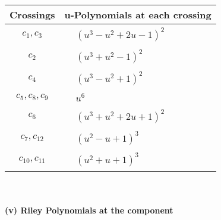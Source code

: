 \documentclass[1p]{elsarticle_modified}
\theoremstyle{definition}
\begin{document}
\begin{tabular}{m{50pt}|m{274pt}}
Crossings & \hspace{64pt}u-Polynomials at each crossing \\
\hline $$\begin{aligned}c_{1},c_{3}\end{aligned}$$&$\begin{aligned}
&(u^3- u^2+2 u-1)^2
\end{aligned}$\\
\hline $$\begin{aligned}c_{2}\end{aligned}$$&$\begin{aligned}
&(u^3+u^2-1)^2
\end{aligned}$\\
\hline $$\begin{aligned}c_{4}\end{aligned}$$&$\begin{aligned}
&(u^3- u^2+1)^2
\end{aligned}$\\
\hline $$\begin{aligned}c_{5},c_{8},c_{9}\end{aligned}$$&$\begin{aligned}
&u^6
\end{aligned}$\\
\hline $$\begin{aligned}c_{6}\end{aligned}$$&$\begin{aligned}
&(u^3+u^2+2 u+1)^2
\end{aligned}$\\
\hline $$\begin{aligned}c_{7},c_{12}\end{aligned}$$&$\begin{aligned}
&(u^2- u+1)^3
\end{aligned}$\\
\hline $$\begin{aligned}c_{10},c_{11}\end{aligned}$$&$\begin{aligned}
&(u^2+u+1)^3
\end{aligned}$\\
\hline
\end{tabular}\\~\\
\newpage\renewcommand{\arraystretch}{1}
\flushleft \textbf{(v) Riley Polynomials at the component}\newline \\
\end{document}
